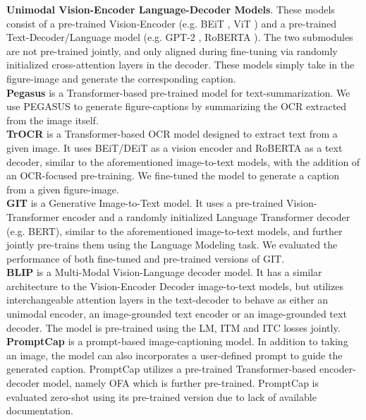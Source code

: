 \documentclass[11pt]{article}
\renewcommand{\cite}[1]{\citep{#1}}
\begin{document}
\textbf{Unimodal Vision-Encoder Language-Decoder Models}. These models consist of a pre-trained Vision-Encoder (e.g. BEiT \cite{bao2022beit}, ViT \cite{dosovitskiy2020vit}) and a pre-trained Text-Decoder/Language model (e.g. GPT-2 \cite{radford2019language}, RoBERTA \cite{liu2019roberta}). The two submodules are not pre-trained jointly, and only aligned during fine-tuning via randomly initialized cross-attention layers in the decoder. These models simply take in the figure-image and generate the corresponding caption.
\\
\textbf{Pegasus} \cite{zhang2020pegasus} is a Transformer-based pre-trained model for text-summarization. We use PEGASUS to generate figure-captions by summarizing the OCR extracted from the image itself. 
\\
\textbf{TrOCR} \cite{li2021trocr} is a Transformer-based OCR model designed to extract text from a given image. It uses BEiT/DEiT as a vision encoder and RoBERTA as a text decoder, similar to the aforementioned image-to-text models, with the addition of an OCR-focused pre-training. We fine-tuned the model to generate a caption from a given figure-image. 
\\
\textbf{GIT} \cite{wang2022git} is a Generative Image-to-Text model. It uses a pre-trained Vision-Transformer encoder and a randomly initialized Language Transformer decoder (e.g. BERT\cite{devlin2018bert}), similar to the aforementioned image-to-text models, and further jointly pre-trains them using the Language Modeling task. We evaluated the performance of both fine-tuned and pre-trained versions of GIT.  
\\
\textbf{BLIP} \cite{li2022blip} is a Multi-Modal Vision-Language decoder model. It has a similar architecture to the Vision-Encoder Decoder image-to-text models, but utilizes interchangeable attention layers in the text-decoder to behave as either an unimodal encoder, an image-grounded text encoder or an image-grounded text decoder. The model is pre-trained using the LM, ITM and ITC losses jointly. 
\\
\textbf{PromptCap}\cite{hu2022promptcap} is a prompt-based image-captioning model. In addition to taking an image, the model can also incorporates a user-defined prompt to guide the generated caption. PromptCap  utilizes a pre-trained Transformer-based encoder-decoder model, namely OFA \cite{wang2022ofa} which is further pre-trained. PromptCap is evaluated zero-shot using its pre-trained version due to lack of available documentation. 
\\
\end{document}
